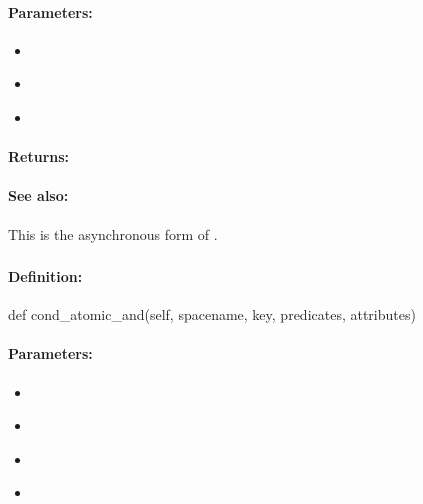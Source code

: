 \paragraph{Parameters:}
\begin{itemize}[noitemsep]
\item {}\\

\item {}\\

\item {}\\

\end{itemize}

\paragraph{Returns:}


\paragraph{See also:}  This is the asynchronous form of .

\pagebreak
\subsubsection{}
\label{api:python:cond_atomic_and}


\paragraph{Definition:}
\begin{pythoncode}
def cond_atomic_and(self, spacename, key, predicates, attributes)
\end{pythoncode}

\paragraph{Parameters:}
\begin{itemize}[noitemsep]
\item {}\\

\item {}\\

\item {}\\

\item {}\\

\end{itemize}

